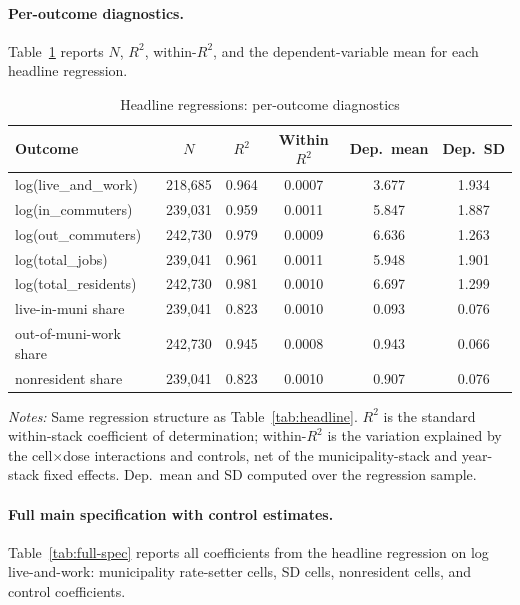 \documentclass[12pt]{article}
\begin{document}
\paragraph{Per-outcome diagnostics.}
Table~\ref{tab:headline-diag} reports $N$, $R^2$, within-$R^2$, and
the dependent-variable mean for each headline regression.

\begin{table}[H]
    \centering
    \caption{Headline regressions: per-outcome diagnostics}
    \label{tab:headline-diag}
    \small
    \begin{tabular}{lccccc}
        \toprule
        Outcome & $N$ & $R^2$ & Within $R^2$ & Dep.\ mean & Dep.\ SD \\
        \midrule
        log(live\_and\_work)    & 218{,}685 & 0.964 & 0.0007 & 3.677 & 1.934 \\
        log(in\_commuters)      & 239{,}031 & 0.959 & 0.0011 & 5.847 & 1.887 \\
        log(out\_commuters)     & 242{,}730 & 0.979 & 0.0009 & 6.636 & 1.263 \\
        log(total\_jobs)        & 239{,}041 & 0.961 & 0.0011 & 5.948 & 1.901 \\
        log(total\_residents)   & 242{,}730 & 0.981 & 0.0010 & 6.697 & 1.299 \\
        live-in-muni share         & 239{,}041 & 0.823 & 0.0010 & 0.093 & 0.076 \\
        out-of-muni-work share    & 242{,}730 & 0.945 & 0.0008 & 0.943 & 0.066 \\
        nonresident share           & 239{,}041 & 0.823 & 0.0010 & 0.907 & 0.076 \\
        \bottomrule
    \end{tabular}
    \vspace{0.3em}
    \begin{minipage}{0.92\textwidth}
        \footnotesize \textit{Notes:} Same regression structure as
        Table~\ref{tab:headline}. $R^2$ is the standard within-stack
        coefficient of determination; within-$R^2$ is the variation
        explained by the cell$\times$dose interactions and controls,
        net of the municipality-stack and year-stack fixed effects. Dep.\ mean
        and SD computed over the regression sample.
    \end{minipage}
\end{table}

\paragraph{Full main specification with control estimates.}
Table~\ref{tab:full-spec} reports all coefficients from the headline
regression on log live-and-work: municipality rate-setter cells, SD
cells, nonresident cells, and control coefficients.
\end{document}
